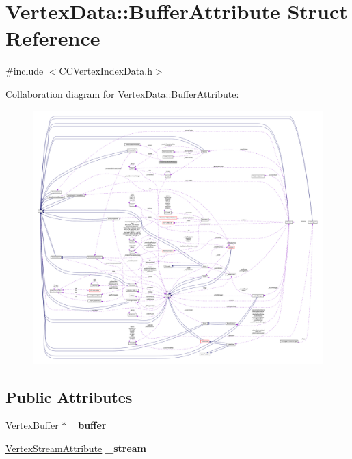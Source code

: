 \hypertarget{structVertexData_1_1BufferAttribute}{}\section{Vertex\+Data\+:\+:Buffer\+Attribute Struct Reference}
\label{structVertexData_1_1BufferAttribute}


{\ttfamily \#include $<$C\+C\+Vertex\+Index\+Data.\+h$>$}



Collaboration diagram for Vertex\+Data\+:\+:Buffer\+Attribute\+:
\nopagebreak
\begin{figure}[H]
\begin{center}
\leavevmode
\includegraphics[width=350pt]{structVertexData_1_1BufferAttribute__coll__graph}
\end{center}
\end{figure}
\subsection*{Public Attributes}
\begin{DoxyCompactItemize}
\item 
\mbox{\label{structVertexData_1_1BufferAttribute_aea39b1b5d161358f40d145a33eebd71c}} 
\hyperlink{classVertexBuffer}{Vertex\+Buffer} $\ast$ {\bfseries \+\_\+buffer}
\item 
\mbox{\label{structVertexData_1_1BufferAttribute_a883227892ee19a38d534dfaf9f2c7776}} 
\hyperlink{structVertexStreamAttribute}{Vertex\+Stream\+Attribute} {\bfseries \+\_\+stream}
\end{DoxyCompactItemize}


